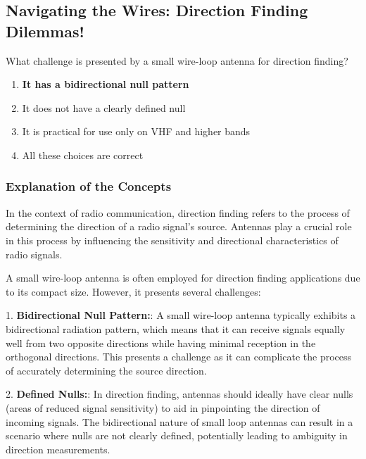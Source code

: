 \subsection{Navigating the Wires: Direction Finding Dilemmas!}

\begin{tcolorbox}[colback=gray!10, colframe=black, title=E9H05] What challenge is presented by a small wire-loop antenna for direction finding?

\begin{enumerate}[label=\Alph*.]
    \item \textbf{It has a bidirectional null pattern}
    \item It does not have a clearly defined null
    \item It is practical for use only on VHF and higher bands
    \item All these choices are correct
\end{enumerate} \end{tcolorbox}

\subsubsection{Explanation of the Concepts}

In the context of radio communication, direction finding refers to the process of determining the direction of a radio signal's source. Antennas play a crucial role in this process by influencing the sensitivity and directional characteristics of radio signals.

A small wire-loop antenna is often employed for direction finding applications due to its compact size. However, it presents several challenges:

1. \textbf{Bidirectional Null Pattern:}: A small wire-loop antenna typically exhibits a bidirectional radiation pattern, which means that it can receive signals equally well from two opposite directions while having minimal reception in the orthogonal directions. This presents a challenge as it can complicate the process of accurately determining the source direction.

2. \textbf{Defined Nulls:}: In direction finding, antennas should ideally have clear nulls (areas of reduced signal sensitivity) to aid in pinpointing the direction of incoming signals. The bidirectional nature of small loop antennas can result in a scenario where nulls are not clearly defined, potentially leading to ambiguity in direction measurements.

